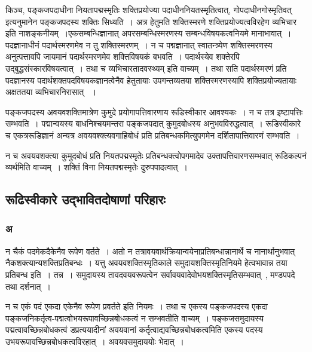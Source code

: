 			किञ्च, पङ्कजपदाधीना नियतापद्मस्मृतिः शक्तिप्रयोज्या पदाधीननियतस्मृतित्वात्, गोपदाधीनगोस्मृतिवत् इत्यनुमानेन पङ्कजपदस्य  शक्तिः सिध्यति~। अत्र हेतुमति शक्तिस्मरणे शक्तिप्रयोज्यत्वविरहेण व्यभिचार इति नाशङ्कनीयम्~।एकसम्बन्धिज्ञानात्  अपरसम्बन्धिस्मरणस्य सम्बन्धविषयकत्वनियमे मानाभावात्~।पदज्ञानाधीनं पदार्थस्मरणमेव न तु शक्तिस्मरणम्~। न च पद्मज्ञानात् स्वातन्त्र्येण शक्तिस्मरणस्य अनुत्पत्तावपि जायमानं पदार्थस्मरणमेव  शक्तिविषयकं बभवति~। पदार्थस्येव शक्तेरपि उद्बुद्धसंस्कारविषयत्वात्~। तथा च व्यभिचारतादवस्थ्यम् इति वाच्यम्~। तथा सति पदार्थस्मरणं प्रति  पदज्ञानस्य पदार्थशक्तपदविषयकज्ञानत्वेनैव हेतुतायाः उपगन्तव्यतया शक्तिस्मरणस्यापि  शक्तिप्रयोज्यतायाः अक्षततया व्यभिचारनिरासात् ~।

			पङ्कजपदस्य अवयवशक्तिमात्रेण  कुमुदे प्रयोगापत्तिवारणाय रूडिस्वीकार आवश्यकः~। न च तत्र इष्टापत्तिः सम्भवति~। पद्मान्वयस्य  बाधनिश्चयमन्तरा पङ्कजपदात्  कुमुदबोधस्य अनुभवविरुद्धत्वात्~। रूडिस्वीकारे च एकत्ररूडिज्ञानं अन्यत्र अवयवश्क्त्यवगाहिबोधं प्रति प्रतिबन्धकमित्युपगमेन दर्शितापात्तिवारणं सम्भवति~।

			न च अवयवशक्त्या कुमुदबोधं प्रति नियतपद्मस्मृतेः प्रतिबन्धक्त्वोपगमादेव उक्तापत्तिवारणसम्भवात्  रूडिकल्पनं व्यर्थमिति वाच्यम्~। शक्तिं विना नियतपद्मस्मृतेः दुरुपपादत्वात्~।

		\subsection{रूढिस्वीकारे उद्भावितदोषाणां परिहारः}
		
			\subsubsection{अ}
		
				\begin{small}
			
					न चैकं पदमेकदैकेनैव रूपेण वर्तते~। अतो न तत्रावयवार्थक्रियान्वयेनाप्रतिबन्धान्नानार्थे च नानार्थानुभवात् नैकशक्त्यान्यशक्तिप्रतिबन्धः~। यत्तु अवयवशक्तिस्मृतिकाले समुदायशक्तिस्मृतिनियमे हेत्वभावान्न तया प्रतिबन्ध इति~। तन्न~। समुदायस्य तावदवयवरूपत्वेन सर्वावयवादेवोभयशक्तिस्मृतिसम्भवात्~, मण्डपपदे तथा दर्शनात्~।
				\end{small}
		
			न च एकं पदं एकदा एकेनैव रूपेण प्रवर्तते इति नियमः~। तथा च एकस्य पङ्कजपदस्य एकदा पङ्कजनिकर्तृत्व-पद्मत्वोभयरूपावच्छिन्नबोधकत्वं  न सम्भवतीति वाच्यम्~। पङ्कजसमुदायस्य पद्मत्वावच्छिन्नबोधकत्वं डप्रत्ययादीनां अवयवानां कर्तृत्वाद्यवच्छिन्नबोधकत्वमिति एकस्य पदस्य उभयरूपावच्छिन्नबोधकत्वविरहात्~। अवयवसमुदाययोः भेदात्~। 
  
